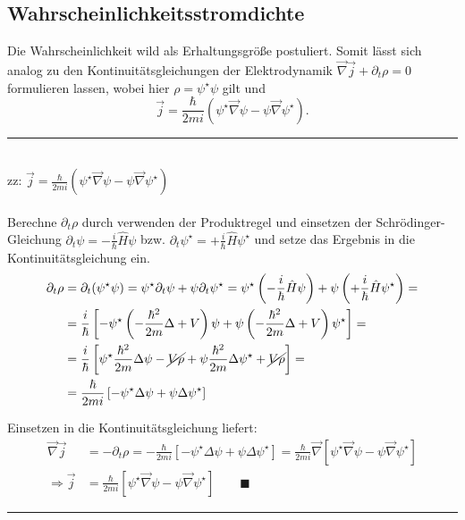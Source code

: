 \documentclass{article}
\newcommand{\lr}[1]{\left(#1\right)}
\newcommand{\lreck}[1]{\left[#1\right]}
\begin{document}
\subsection{Wahrscheinlichkeitsstromdichte}
Die Wahrscheinlichkeit wild als Erhaltungsgröße postuliert. Somit lässt sich analog zu den Kontinuitätsgleichungen der Elektrodynamik $\vec{\nabla}\vec{j} + \partial_t\rho = 0$ formulieren lassen, wobei hier $\rho = \psi^\star\psi$ gilt und
	\begin{equation}
		\vec{j} = \frac{\hbar}{2mi}\lr{\psi^\star\vec{\nabla}\psi - \psi\vec{\nabla}\psi^\star}.
	\end{equation}

\vspace{0.5cm}

{\color{violet}
\hrule
	\\
	zz: $\vec{j} = \frac{\hbar}{2mi}\lr{\psi^\star\vec{\nabla}\psi - \psi\vec{\nabla}\psi^\star}$\\
	\\	
	Berechne $\partial_t\rho$ durch verwenden der Produktregel und einsetzen der Schrödinger-Gleichung $\partial_t\psi = -\frac{i}{\hbar}\hat{H}\psi$ bzw. $\partial_t\psi^\star = +\frac{i}{\hbar}\hat{H}\psi^\star$ und setze das Ergebnis in die Kontinuitätsgleichung ein.
		\begin{align*}
			\partial_t \rho &= \partial_t(\psi^\star\psi) = \psi^\star \partial_t \psi + \psi \partial_t \psi^\star = \psi^\star \lr{ -\frac{i}{\hbar}\hat{H}\psi } + \psi \lr{ +\frac{i}{\hbar}\hat{H}\psi^\star } = \\
			&= \frac{i}{\hbar} \lreck{ -\psi^\star \lr{ -\frac{\hbar^2}{2m}\Delta + V } \psi + \psi \lr{ -\frac{\hbar^2}{2m}\Delta + V } \psi^\star } = \\
			&= \frac{i}{\hbar} \lreck{ \psi^\star\frac{\hbar^2}{2m}\Delta \psi  - \cancel{V\rho} + \psi\frac{\hbar^2}{2m}\Delta \psi^\star + \cancel{V\rho} } = \\
			&= \frac{\hbar}{2mi} \lreck{ -\psi^\star\Delta\psi + \psi\Delta\psi^\star }
		\end{align*}
	
	Einsetzen in die Kontinuitätsgleichung liefert:
		\begin{align*}
			\vec{\nabla}\vec{j} &= -\partial_t\rho = - \frac{\hbar}{2mi} \lreck{ -\psi^\star\Delta\psi + \psi\Delta\psi^\star } = \frac{\hbar}{2mi}\vec{\nabla} \lreck{ \psi^\star\vec{\nabla}\psi - \psi\vec{\nabla}\psi^\star }\\
			\Rightarrow \vec{j} &= \frac{\hbar}{2mi} \lreck{ \psi^\star\vec{\nabla}\psi - \psi\vec{\nabla}\psi^\star } \qquad\blacksquare
		\end{align*}
\hrule
}
\end{document}
